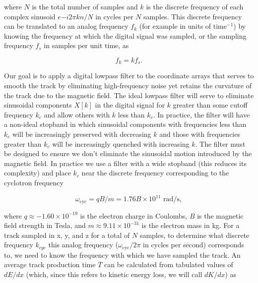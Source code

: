 \documentclass{JINST}
\begin{document}
\noindent where $N$ is the total number of samples and $k$ is the discrete frequency of each complex
sinusoid $e{-i2\pi kn/N}$ in cycles per $N$ samples.  This discrete frequency can be translated to an analog
frequency $f_{k}$ (for example in units of time$^{-1}$) by knowing the frequency at which the digital signal was
sampled, or the sampling frequency $f_{s}$ in samples per unit time, as

\begin{equation}
f_{k} = kf_{s}.
\end{equation}

Our goal is to apply a digital lowpass filter to the coordinate arrays that serves to
smooth the track by eliminating high-frequency noise yet retains the curvature of the track
due to the magnetic field.  The ideal lowpass filter will serve to eliminate sinusoidal components
$X[k]$ in the digital signal for $k$ greater than some cutoff frequency $k_{c}$ and allow 
others with $k$ less than $k_{c}$.  In practice, the filter will have a non-ideal stopband in which sinusoidal 
components with frequencies less than $k_{c}$ will be increasingly preserved with decreasing $k$ and those 
with frequencies greater than $k_{c}$ will be increasingly quenched with increasing $k$.  The filter must be designed 
to ensure we don't eliminate the sinusoidal motion introduced by the magnetic field.  In practice we use a
filter with a wide stopband (this reduces its complexity) and place $k_{c}$ near the discrete frequency corresponding
to the cyclotron frequency


\begin{equation}
\omega_{\mathrm{cyc}} = qB/m = 1.76B \times 10^{11} \,\, \mathrm{rad/s},
\end{equation}

\noindent where $q \approx -1.60 \times 10^{-19}$ is the electron charge in Coulombs, $B$ is the magnetic field
strength in Tesla, and $m \approx 9.11 \times 10^{-31}$ is the electron mass in kg.  For a 
track sampled in x, y, and z for a total of $N$ samples, to determine what discrete frequency $k_{cyc}$ this analog
frequency ($\omega_{\mathrm{cyc}}/2\pi$ in cycles per second) corresponds to, we need to know the frequency with
which we have sampled the track.  An average track production time $\overline{T}$ can be calculated from 
tabulated values of $dE/dx$ (which, since this refers to kinetic energy loss, we will call $dK/dx$) as
\end{document}
